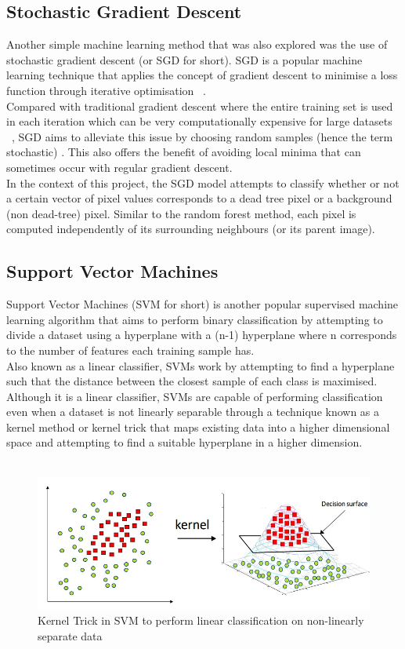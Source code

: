 \subsection{Stochastic Gradient Descent}
Another simple machine learning method that was also explored was the use of stochastic gradient descent (or SGD for short). SGD is a popular machine learning technique that applies the concept of gradient descent to minimise a loss function through iterative optimisation ~\cite{b9}.\\ Compared with traditional gradient descent where the entire training set is used in each iteration which can be very computationally expensive for large datasets ~\cite{b10}, SGD aims to alleviate this issue by choosing random samples (hence the term stochastic) . This also offers the benefit of avoiding local minima that can sometimes occur with regular gradient descent.\\ 
In the context of this project, the SGD model attempts to classify whether or not a certain vector of pixel values corresponds to a dead tree pixel or a background (non dead-tree) pixel. Similar to the random forest method, each pixel is computed independently of its surrounding neighbours (or its parent image).\\
\subsection{Support Vector Machines}
Support Vector Machines (SVM for short) is another popular supervised machine learning algorithm that aims to perform binary classification by attempting to divide a dataset using a hyperplane with a (n-1) hyperplane where n corresponds to the number of features each training sample has.\cite{b11}\\
Also known as a linear classifier, SVMs work by attempting to find a hyperplane such that the distance between the closest sample of each class is maximised. Although it is a linear classifier, SVMs are capable of performing classification even when a dataset is not linearly separable through a technique known as a kernel method or kernel trick that maps existing data into a higher dimensional space and attempting to find a suitable hyperplane in a higher dimension.~\cite{b12}\\
\\
\begin{figure}[ht]
\includegraphics[width=1\linewidth]{figs/svm-kernel-trick.png}
\caption{Kernel Trick in SVM to perform linear classification on non-linearly separate data}
\label{fig:svm}
\end{figure}

